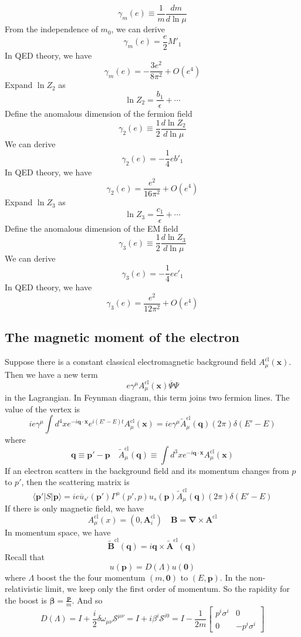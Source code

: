 \[\gamma_m(e) \equiv \frac{1}{m} \frac{dm}{d \ln \mu}\]
From the independence of $m_0$, we can derive
\[\gamma_m(e) = \frac{e}{2} M'_1\]
In QED theory, we have
\[\gamma_m(e) = -\frac{3e^2}{8\pi^2} + O(e^4)\]
Expand $\ln Z_{2}$ as
\[\ln Z_{2} = \frac{b_1}{\epsilon} + \cdots\]
Define the anomalous dimension of the fermion field
\[\gamma_{2}(e) \equiv \frac{1}{2} \frac{d\ln Z_{2}}{d \ln \mu}\]
We can derive
\[\gamma_{2}(e) = -\frac{1}{4}e b'_1\]
In QED theory, we have
\[\gamma_2(e) = \frac{e^2}{16\pi^2} + O(e^4)\]
Expand $\ln Z_{3}$ as
\[\ln Z_{3} = \frac{c_1}{\epsilon} + \cdots\]
Define the anomalous dimension of the EM field
\[\gamma_{3}(e) \equiv \frac{1}{2} \frac{d\ln Z_{3}}{d \ln \mu}\]
We can derive
\[\gamma_{3}(e) = -\frac{1}{4}e c'_1\]
In QED theory, we have
\[\gamma_3(e) = \frac{e^2}{12\pi^2} + O(e^4)\]

\subsection{The magnetic moment of the electron}
Suppose there is a constant classical electromagnetic background field $A_{\mu}^{\mathrm{cl}}(\bm{x})$. Then we have a new term
\[e\gamma^{\mu}A_{\mu}^{\mathrm{cl}}(\bm{x}) \overline{\Psi}\Psi\]
in the Lagrangian. In Feynman diagram, this term joins two fermion lines. 
The value of the vertex is
\[ie\gamma^{\mu}\int d^4x e^{-i\bm{q}\cdot\bm{x}}e^{i(E'-E)t} A_{\mu}^{\mathrm{cl}}(\bm{x}) = ie\gamma^{\mu}\tilde{A}_{\mu}^{\mathrm{cl}}(\bm{q})(2\pi)\delta(E'-E)\]
where
\[\bm{q} \equiv \bm{p}' - \bm{p} \quad \tilde{A}_{\mu}^{\mathrm{cl}}(\bm{q}) \equiv \int d^3x e^{-i\bm{q}\cdot\bm{x}} A_{\mu}^{\mathrm{cl}}(\bm{x})\]
If an electron scatters in the background field and its momentum changes from $p$ to $p'$, then the scattering matrix is
\[\langle \bm{p}' | S | \bm{p} \rangle = ie\overline{u}_{s'}(\bm{p}')\Gamma^{\mu}(p',p)u_s(\bm{p})\tilde{A}_{\mu}^{\mathrm{cl}}(\bm{q})(2\pi)\delta(E'-E)\]
If there is only magnetic field, we have
\[A_{\mu}^{\mathrm{cl}}(x) = (0,\bm{A}_{i}^{\mathrm{cl}}) \quad \bm{B} = \bm{\nabla} \times \bm{A}^{\mathrm{cl}}\]
In momentum space, we have
\[\tilde{\bm{B}}^{\mathrm{cl}}(\bm{q}) = i\bm{q}\times\tilde{\bm{A}}^{\mathrm{cl}}(\bm{q})\]
Recall that
\[u(\bm{p}) = D(\Lambda)u(\bm{0})\]
where $\Lambda$ boost the the four momentum $(m,\bm{0})$ to $(E,\bm{p})$.
In the non-relativistic limit, we keep only the first order of momentum. So the rapidity for the boost is $\bm{\beta} = \frac{\bm{p}}{m}$. And so
\[D(\Lambda) = I + \frac{i}{2}\delta\omega_{\mu\nu}\mathcal{S}^{\mu\nu} = I + i \beta^i \mathcal{S}^{i0} = I - \frac{1}{2m} \begin{bmatrix} p^i \sigma^i  &0\\0& -p^i \sigma^i \end{bmatrix} \]
